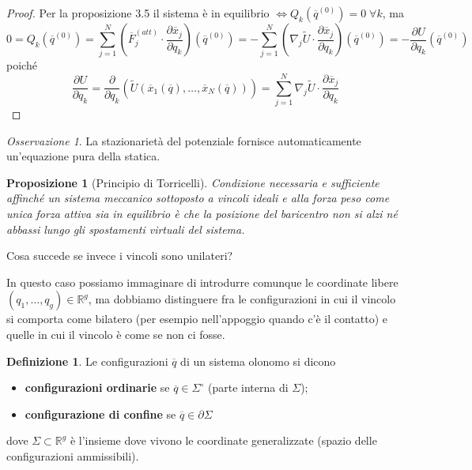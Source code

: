 \documentclass{book}
\theoremstyle{plain}
\theoremstyle{plain}
\theoremstyle{plain}
\theoremstyle{plain}
\theoremstyle{plain}
\newtheorem{prop}{Proposizione}[chapter]
\theoremstyle{definition}
\newtheorem{defi}{Definizione}[chapter]
\theoremstyle{remark}
\newtheorem*{oss}{Osservazione}
\theoremstyle{definition}
\begin{document}
\begin{proof}
    Per la proposizione 3.5 il sistema è in equilibrio $\iff Q_k(\overline{q}^{(0)})=0\;\forall k$, ma
    \begin{displaymath}
        0=Q_k(\overline{q}^{(0)})=\sum_{j=1}^N\left(\overline{F}_j^{(att)}\cdot\frac{\partial\overline{x}_j}{\partial q_k}\right)(\overline{q}^{(0)})=-\sum_{j=1}^N\left(\nabla_j\widetilde{U}\cdot\frac{\partial\overline{x}_j}{\partial q_k}\right)(\overline{q}^{(0)})=-\frac{\partial U}{\partial q_k}(\overline{q}^{(0)})
    \end{displaymath}
    poiché
    \begin{displaymath}
        \frac{\partial U}{\partial q_k}=\frac{\partial}{\partial q_k}\left(\widetilde{U}(\overline{x}_1(\overline{q}),\ldots,\overline{x}_N(\overline{q}))\right)=\sum_{j=1}^N\nabla_j\widetilde{U}\cdot\frac{\partial\overline{x}_j}{\partial q_k}
    \end{displaymath}
\end{proof}

\begin{oss}
    La stazionarietà del potenziale fornisce automaticamente un'equazione pura della statica.
\end{oss}

\begin{prop}[Principio di Torricelli]
    Condizione necessaria e sufficiente affinché un sistema meccanico sottoposto a vincoli ideali e alla forza peso come unica forza attiva sia in equilibrio è che la posizione del baricentro non si alzi né abbassi lungo gli spostamenti virtuali del sistema.
\end{prop}

\noindent Cosa succede se invece i vincoli sono unilateri?

\noindent In questo caso possiamo immaginare di introdurre comunque le coordinate libere $(q_1, \ldots, q_g) \in \mathbb{R}^g$, ma dobbiamo distinguere fra le configurazioni in cui il vincolo si comporta come bilatero (per esempio nell'appoggio quando c'è il contatto) e quelle in cui il vincolo è come se non ci fosse.

\begin{defi}
    Le configurazioni $\overline{q}$ di un sistema olonomo si dicono
    \begin{itemize}
        \item \textbf{configurazioni ordinarie} se $\overline{q} \in \Sigma^{\circ}$ (parte interna di $\Sigma$);
        \item \textbf{configurazione di confine} se $\overline{q} \in \partial \Sigma$
    \end{itemize}
    dove $\Sigma \subset \mathbb{R}^g$ è l'insieme dove vivono le coordinate generalizzate (spazio delle configurazioni ammissibili).
\end{defi}
\end{document}
